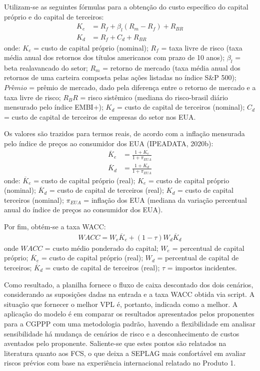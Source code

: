 Utilizam-se as seguintes fórmulas para a obtenção do custo específico do capital próprio e do capital de terceiros:
\begin{align}
    K_e&=R_f+\beta_l(R_m-R_f)+R_{BR} \\
    K_d&=R_f+C_d+R_{BR}
\end{align}
onde: $K_e$ = custo de capital próprio (nominal); $R_f$ =	taxa livre de risco (taxa média anual dos retornos dos títulos americanos com prazo de 10 anos); 	$\beta_l$ =	beta realavancado do setor; $R_m$ =	retorno de mercado (taxa média anual dos retornos de uma carteira composta pelas ações listadas no índice S&P 500); $Prêmio$ = prêmio de mercado, dado pela diferença entre o retorno de mercado e a taxa livre de risco; $R_BR$ =	risco sistêmico (mediana do risco-brasil diário mensurado pelo índice EMBI+); 	$K_d$ =	custo de capital de terceiros (nominal); $C_d$ =	custo de capital de terceiros de empresas do setor nos EUA.

Os valores são trazidos para termos reais, de acordo com a inflação mensurada pelo índice de preços ao consumidor dos EUA (IPEADATA, 2020b):
\begin{align}
    \overline{K}_e&=\frac{1+K_e}{1+\pi_{EUA}} \\
    \overline{K}_d&=\frac{1+K_d}{1+\pi_{EUA}}
\end{align}
onde: $\overline{K}_e$ = custo de capital próprio (real);  $K_e$ =	custo de capital próprio (nominal); $\overline{K}_d$ = custo de capital de terceiros (real); $K_d$ = custo de capital terceiros (nominal); $\pi_{EUA}$ =	inflação dos EUA (mediana da variação percentual anual do índice de preços ao consumidor dos EUA).

Por fim, obtém-se a taxa WACC:
\begin{align}
    WACC=W_e\overline{K}_e+(1-\tau)W_d\overline{K}_d
\end{align}
onde $WACC$ = custo médio ponderado do capital; $W_e$ = percentual de capital próprio; $\overline{K}_e$ = custo de capital próprio (real); $W_d$ = percentual de capital de terceiros; $\overline{K}_d$ = custo de capital de terceiros (real); $\tau$ = impostos incidentes.

Como resultado, a planilha fornece o fluxo de caixa descontado dos dois cenários, considerando as suposições dadas na entrada e a taxa WACC obtida via script. A situação que fornecer o melhor VPL é, portanto, indicada como a melhor. A aplicação do modelo é em comparar os resultados apresentados pelos proponentes para a CGPPP com uma metodologia padrão, havendo a flexibilidade em analisar sensibilidade há mudança de cenários de risco e a desconhecimento de custos aventados pelo proponente. Saliente-se que estes pontos são relatados na literatura quanto aos FCS, o que deixa a SEPLAG mais confortável em avaliar riscos prévios com base na experiência internacional relatado no Produto 1.






